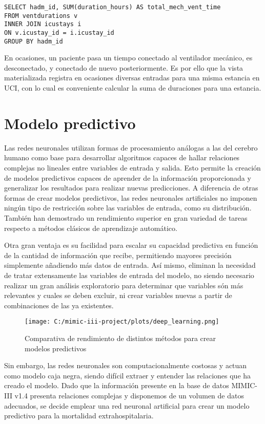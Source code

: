 \documentclass{report}
\begin{document}
\begin{verbatim}
SELECT hadm_id, SUM(duration_hours) AS total_mech_vent_time
FROM ventdurations v
INNER JOIN icustays i
ON v.icustay_id = i.icustay_id
GROUP BY hadm_id
\end{verbatim}

En ocasiones, un paciente pasa un tiempo conectado al ventilador
mecánico, es desconectado, y conectado de nuevo posteriormente. Es por
ello que la vista materializada registra en ocasiones diversas entradas
para una misma estancia en UCI, con lo cual es conveniente calcular la
suma de duraciones para una estancia.

\chapter{Modelo predictivo}

Las redes neuronales utilizan formas de procesamiento análogas a las del cerebro humano como base para desarrollar algoritmos capaces de hallar relaciones complejas no lineales entre variables de entrada y salida.
Esto permite la creación de modelos predictivos capaces de aprender de la información proporcionada y generalizar los resultados para realizar nuevas predicciones. 
A diferencia de otras formas de crear modelos predictivos, las redes neuronales artificiales no imponen ningún tipo de restricción sobre las variables de entrada, como su distribución.
También han demostrado un rendimiento superior en gran variedad de tareas respecto a métodos clásicos de aprendizaje automático.

Otra gran ventaja es su facilidad para escalar su capacidad predictiva en función de la cantidad de información que recibe, permitiendo mayores precisión simplemente añadiendo más datos de entrada. Así mismo, eliminan la necesidad de tratar extensamente las variables de entrada del modelo, no siendo necesario realizar un gran análisis exploratorio para determinar que variables són más relevantes y cuales se deben excluir, ni crear variables nuevas a partir de combinaciones de las ya existentes.

\begin{figure}[h]
\centering
\texttt{[image: C:/mimic-iii-project/plots/deep\_learning.png]}
\caption{Comparativa de rendimiento de distintos métodos para crear modelos predictivos}
\end{figure}

Sin embargo, las redes neuronales son computacionalmente costosas y actuan como modelo caja negra, siendo difícil extraer y entender las relaciones que ha creado el modelo.  Dado que la información presente en la base de datos MIMIC-III v1.4 presenta relaciones complejas y disponemos de un volumen de datos adecuados, se decide emplear una red neuronal artificial para crear un modelo predictivo para la mortalidad extrahospitalaria.
\newpage
\end{document}
